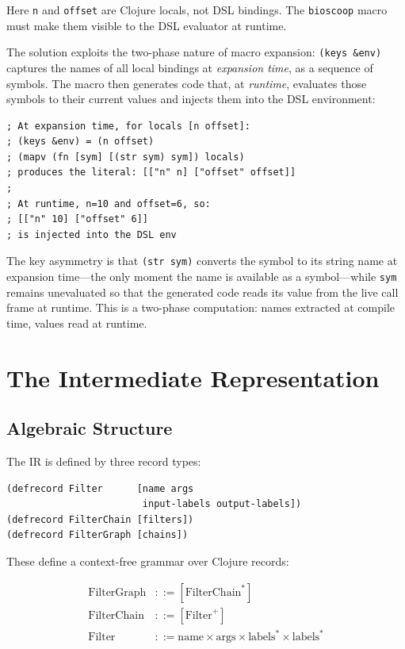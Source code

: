 \documentclass[english,submission]{programming}
\begin{document}
Here \texttt{n} and \texttt{offset} are Clojure locals, not DSL bindings. The \texttt{bioscoop} macro must make them visible to the DSL evaluator at runtime.

The solution exploits the two-phase nature of macro expansion: \texttt{(keys \&env)} captures the names of all local bindings at \emph{expansion time}, as a sequence of symbols. The macro then generates code that, at \emph{runtime}, evaluates those symbols to their current values and injects them into the DSL environment:

\begin{lstlisting}[caption={The locals injection mechanism}]
; At expansion time, for locals [n offset]:
; (keys &env) = (n offset)
; (mapv (fn [sym] [(str sym) sym]) locals)
; produces the literal: [["n" n] ["offset" offset]]
;
; At runtime, n=10 and offset=6, so:
; [["n" 10] ["offset" 6]]
; is injected into the DSL env
\end{lstlisting}

The key asymmetry is that \texttt{(str sym)} converts the symbol to its string name at expansion time---the only moment the name is available as a symbol---while \texttt{sym} remains unevaluated so that the generated code reads its value from the live call frame at runtime. This is a two-phase computation: names extracted at compile time, values read at runtime.

\section{The Intermediate Representation}

\subsection{Algebraic Structure}

The IR is defined by three record types:

\begin{lstlisting}[caption={IR record definitions}]
(defrecord Filter      [name args
                        input-labels output-labels])
(defrecord FilterChain [filters])
(defrecord FilterGraph [chains])
\end{lstlisting}

These define a context-free grammar over Clojure records:

\begin{align*}
\text{FilterGraph} &::= [\text{FilterChain}^*] \\
\text{FilterChain}  &::= [\text{Filter}^+] \\
\text{Filter}       &::= \text{name} \times \text{args} \times \text{labels}^* \times \text{labels}^*
\end{align*}
\end{document}

